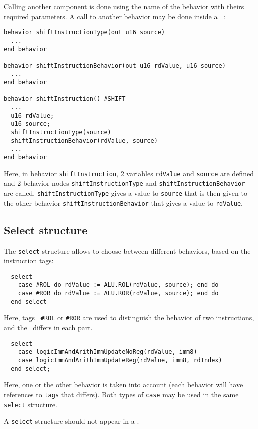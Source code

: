 Calling another component is done using the name of the behavior with theirs required parameters. A call to another behavior may be done inside a \blocdo~:
\begin{lstlisting}
behavior shiftInstructionType(out u16 source)
  ...
end behavior

behavior shiftInstructionBehavior(out u16 rdValue, u16 source)
  ...
end behavior

behavior shiftInstruction() #SHIFT
  ...
  u16 rdValue;
  u16 source;
  shiftInstructionType(source)
  shiftInstructionBehavior(rdValue, source)
  ...
end behavior
\end{lstlisting}
Here, in behavior {\tt shiftInstruction}, 2 variables  {\tt rdValue} and {\tt source} are defined and 2 behavior nodes  {\tt shiftInstructionType} and {\tt shiftInstruction\-Behavior} are called.  {\tt shiftInstructionType} gives a value to \texttt{source} that is then given to the other behavior  {\tt shiftInstructionBehavior} that gives a value to  {\tt rdValue}.

\subsection{Select structure}
\label{sec:behSelect}

The \texttt{select} structure allows to choose between different behaviors, based on the instruction tags:
\begin{lstlisting}
  select
    case #ROL do rdValue := ALU.ROL(rdValue, source); end do
    case #ROR do rdValue := ALU.ROR(rdValue, source); end do
  end select
\end{lstlisting}
Here, tags \texttt{ \#ROL} or \texttt{\#ROR} are used to distinguish the behavior of two instructions, and the \blocsdo\ differs in each part.

\begin{lstlisting}
  select
    case logicImmAndArithImmUpdateNoReg(rdValue, imm8)
    case logicImmAndArithImmUpdateReg(rdValue, imm8, rdIndex)
  end select;
\end{lstlisting}
Here, one or the other behavior is taken into account (each behavior will have references to \texttt{tags} that differs). Both types of \texttt{case} may be used in the same \texttt{select} structure.

A \texttt{select} structure should not appear in a \blocdo.

